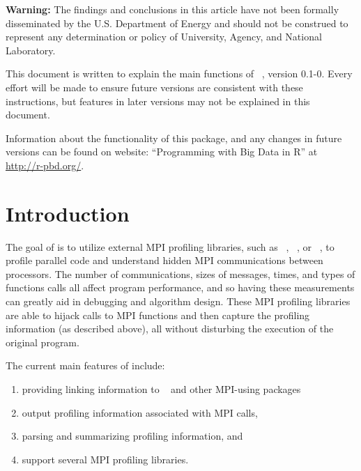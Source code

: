 {\color{red} \bf Warning:}
The findings and conclusions in this article have not been
formally disseminated by the U.S. Department of Energy
and should not be construed to represent any determination or
policy of University, Agency, and National Laboratory.

This document is written to explain the main
functions of ~\citep{Chen2013pbdPROFpackage}, version 0.1-0.
Every effort will be made to ensure future versions are consistent with
these instructions, but features in later versions may not be explained
in this document.

Information about the functionality of this package,
and any changes in future versions can be found on website:
``Programming with Big Data in R'' at
\url{http://r-pbd.org/}.



\section{Introduction}
\label{sec:introduction}

The goal of  is to utilize external MPI profiling libraries,
such as ~\citep{fpmpi}, ~\citep{mpiP}, or
~\citep{TAU},
to profile parallel  code and understand hidden MPI
communications between processors. The number of communications,
sizes of messages, times, and types of functions calls all affect program
performance, and so having these measurements can greatly aid in debugging and 
algorithm design. These MPI profiling libraries are able to
hijack calls to MPI functions and then capture the profiling information 
(as described above), all without disturbing the execution of the original program.

The current main features of  include:
\begin{enumerate}
\item providing linking information to ~\citep{pbdR2012} and other MPI-using  packages
\item output profiling information associated with MPI calls,
\item parsing and summarizing profiling information, and
\item support several MPI profiling libraries.
\end{enumerate}


